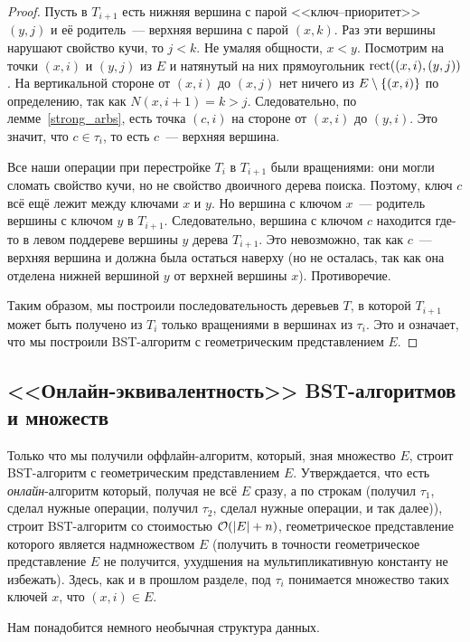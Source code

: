 \begin{proof}
	Пусть в $T_{i + 1}$ есть нижняя вершина с парой <<ключ--приоритет>> $(y, j)$ и её родитель~--- верхняя вершина с парой $(x, k)$. Раз эти вершины нарушают свойство кучи, то $j < k$.
	Не умаляя общности, $x < y$. Посмотрим на точки $(x, i)$ и $(y, j)$ из $E$ и натянутый на них прямоугольник $\operatorname{rect}((x, i), (y, j))$. На вертикальной стороне от $(x, i)$ до $(x, j)$ нет ничего из $E \setminus \lbrace(x, i)\rbrace$ по определению, так как $N(x, i + 1) = k > j$. Следовательно, по лемме~\ref{strong_arbs}, есть точка $(c, i)$ на
	стороне от $(x, i)$ до $(y, i)$. Это значит, что $c \in \tau_i$, то есть $c$~--- верхняя вершина.

	Все наши операции при перестройке $T_i$ в $T_{i + 1}$ были вращениями: они могли сломать свойство кучи, но не свойство двоичного дерева поиска. Поэтому, ключ $c$ всё ещё лежит между ключами $x$ и $y$. Но вершина с ключом $x$~--- родитель вершины с ключом $y$ в $T_{i + 1}$. Следовательно, вершина с ключом $c$ находится где-то в левом поддереве вершины $y$ дерева $T_{i + 1}$. Это невозможно, так как $c$~--- верхняя вершина и должна была остаться наверху (но не осталась, так как она отделена нижней вершиной $y$ от верхней вершины $x$). Противоречие.
	
Таким образом, мы построили последовательность деревьев $T$, в которой $T_{i+1}$ 
может быть получено из $T_i$ только вращениями в вершинах из $\tau_i$. Это и означает,
что мы построили BST-алгоритм с геометрическим представлением $E$.
\end{proof}

\subsection{<<Онлайн-эквивалентность>> BST-алгоритмов и \arbs множеств}

Только что мы получили оффлайн-алгоритм, который, зная \arbs множество $E$, строит BST-алгоритм с геометрическим представлением $E$. Утверждается, что есть \emph{онлайн}-алгоритм который, получая не всё $E$ сразу, а по строкам (получил $\tau_1$, сделал нужные операции, получил $\tau_2$, сделал нужные операции, и так далее)), строит BST-алгоритм со стоимостью $\mathcal{O}(\lvert E\rvert + n)$, геометрическое представление которого является
надмножеством $E$
(получить в точности геометрическое представление $E$ не получится, ухудшения на мультипликативную константу не избежать). Здесь, как и в прошлом разделе, под $\tau_i$
понимается множество таких ключей $x$, что $(x, i) \in E$.

Нам понадобится немного необычная структура данных.

